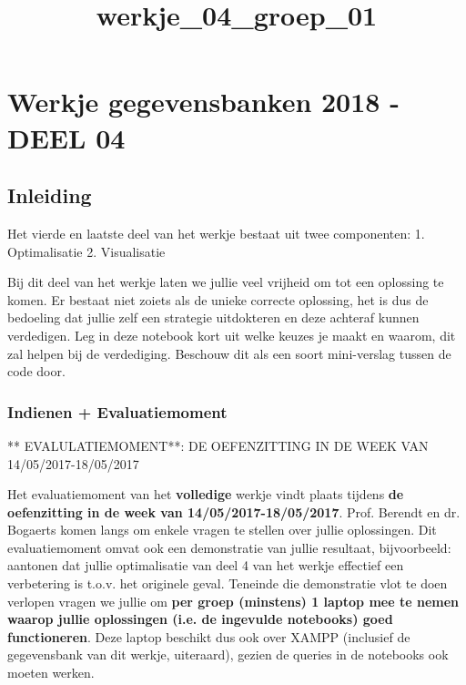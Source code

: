 \documentclass[11pt]{article}
\title{werkje\_04\_groep\_01}
\begin{document}
    
    
    \maketitle
    
    

    
    \section{Werkje gegevensbanken 2018 - DEEL
04}\label{werkje-gegevensbanken-2018---deel-04}

\subsection{Inleiding}\label{inleiding}

Het vierde en laatste deel van het werkje bestaat uit twee componenten:
1. Optimalisatie 2. Visualisatie

Bij dit deel van het werkje laten we jullie veel vrijheid om tot een
oplossing te komen. Er bestaat niet zoiets als de unieke correcte
oplossing, het is dus de bedoeling dat jullie zelf een strategie
uitdokteren en deze achteraf kunnen verdedigen. Leg in deze notebook
kort uit welke keuzes je maakt en waarom, dit zal helpen bij de
verdediging. Beschouw dit als een soort mini-verslag tussen de code
door.

\subsubsection{Indienen +
Evaluatiemoment}\label{indienen-evaluatiemoment}

** EVALULATIEMOMENT**: DE OEFENZITTING IN DE WEEK VAN
14/05/2017-18/05/2017

Het evaluatiemoment van het \textbf{volledige} werkje vindt plaats
tijdens \textbf{de oefenzitting in de week van 14/05/2017-18/05/2017}.
Prof. Berendt en dr. Bogaerts komen langs om enkele vragen te stellen
over jullie oplossingen. Dit evaluatiemoment omvat ook een demonstratie
van jullie resultaat, bijvoorbeeld: aantonen dat jullie optimalisatie
van deel 4 van het werkje effectief een verbetering is t.o.v. het
originele geval. Teneinde die demonstratie vlot te doen verlopen vragen
we jullie om \textbf{per groep (minstens) 1 laptop mee te nemen waarop
jullie oplossingen (i.e. de ingevulde notebooks) goed functioneren}.
Deze laptop beschikt dus ook over XAMPP (inclusief de gegevensbank van
dit werkje, uiteraard), gezien de queries in de notebooks ook moeten
werken.
\end{document}
